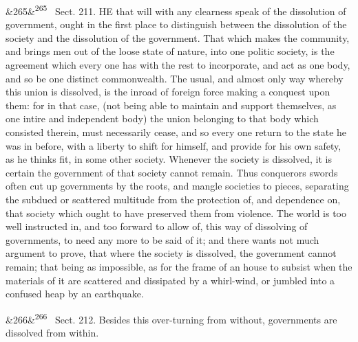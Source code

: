 \documentclass[12pt]{article}
\newcommand{\para}[1][]{\par\noindent\ifx&#1&\else\textsuperscript{\footnotesize #1}~\fi}
\begin{document}
\para[265] Sect. 211. HE that will with any clearness speak of the dissolution of government, ought in the first place to distinguish between the dissolution of the society and the dissolution of the government. That which makes the community, and brings men out of the loose state of nature, into one politic society, is the agreement which every one has with the rest to incorporate, and act as one body, and so be one distinct commonwealth. The usual, and almost only way whereby this union is dissolved, is the inroad of foreign force making a conquest upon them: for in that case, (not being able to maintain and support themselves, as one intire and independent body) the union belonging to that body which consisted therein, must necessarily cease, and so every one return to the state he was in before, with a liberty to shift for himself, and provide for his own safety, as he thinks fit, in some other society. Whenever the society is dissolved, it is certain the government of that society cannot remain. Thus conquerors swords often cut up governments by the roots, and mangle societies to pieces, separating the subdued or scattered multitude from the protection of, and dependence on, that society which ought to have preserved them from violence. The world is too well instructed in, and too forward to allow of, this way of dissolving of governments, to need any more to be said of it; and there wants not much argument to prove, that where the society is dissolved, the government cannot remain; that being as impossible, as for the frame of an house to subsist when the materials of it are scattered and dissipated by a whirl-wind, or jumbled into a confused heap by an earthquake.

\para[266] Sect. 212. Besides this over-turning from without, governments are dissolved from within.
\end{document}
